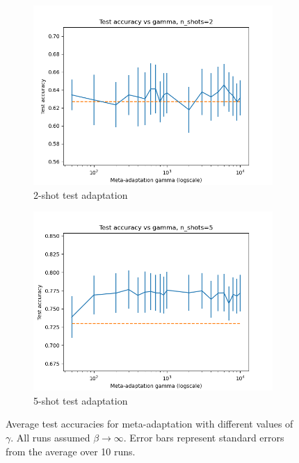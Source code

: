 \documentclass{article}
\theoremstyle{definition}
\begin{document}

\begin{figure}[h!]
	\centering
	\begin{subfigure}[b]{0.49\textwidth}
		\centering
		\includegraphics[width=\textwidth]{accuracy_plot_2}
		\caption{2-shot test adaptation}
	\end{subfigure}
	\hfill
	\begin{subfigure}[b]{0.49\textwidth}
		\centering
		\includegraphics[width=\textwidth]{accuracy_plot_5}
		\caption{5-shot test adaptation}	 	
	\end{subfigure}
	\hfill
	\caption{Average test accuracies for meta-adaptation with different values of $\gamma$. All runs assumed $\beta\rightarrow\infty$. Error bars represent standard errors from the average over 10 runs.}	 
	\label{fig:results-gamma}
\end{figure}
\end{document}
